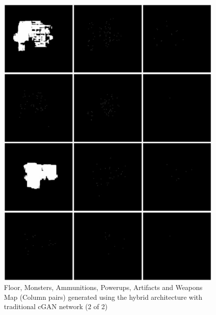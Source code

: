 \documentclass{Configuration_Files/PoliMi3i_thesis}
\begin{document}
\begin{figure}[H]
    \centering
    \includegraphics[width=1\textwidth]{trad_cgan_sample2.jpg}
    \caption[Samples generated using the traditional cGAN network (2 of 2)]{Floor, Monsters, Ammunitions, Powerups, Artifacts and Weapons Map 
(Column pairs) generated using the hybrid architecture with traditional cGAN network (2 of 2)}
    \label{fig:tradcgansample2}
\end{figure}
\end{document}
